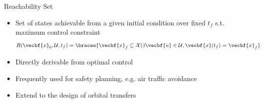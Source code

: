 \begin{frame}{Reachability Set}

\begin{itemize}
    \item Set of states achievable from a given initial condition over fixed \( t_f \) s.t. maximum control constraint
    \[
        R( \vecbf{x}_0, \mathcal{U} , t_f) = \braces{ \vecbf{x}_f \subseteq \mathcal{X} | \exists \vecbf{u} \in \mathcal{U}, \vecbf{x}(t_f) = \vecbf{x}_f }
    \]
    \pause
    \item Directly derivable from optimal control
    \item Frequently used for safety planning, e.g. air traffic avoidance
    \pause
    \item Extend to the design of orbital transfers
\end{itemize}

\end{frame}

